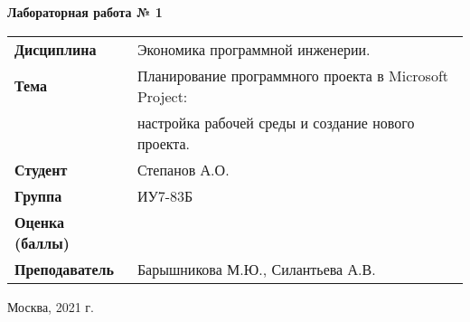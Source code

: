 \begin{center}
    \textbf{Лабораторная работа № 1} \\
    \vspace{0.5cm}
\end{center}

\vspace{4cm}

\begin{flushleft}
    \begin{tabular}{ll}
        \textbf{Дисциплина} & Экономика программной инженерии. \\
        \textbf{Тема} & Планирование программного проекта в Microsoft Project: \\
        & настройка рабочей среды и создание нового проекта. \\
        \textbf{Студент} & Степанов А.О. \\
        \textbf{Группа} & ИУ7-83Б \\
        \textbf{Оценка (баллы)} & \\
        \textbf{Преподаватель} & Барышникова М.Ю., Силантьева А.В. \\
    \end{tabular}
\end{flushleft}

\vspace{4cm}

\begin{center}
    Москва, 2021 г.
\end{center}
